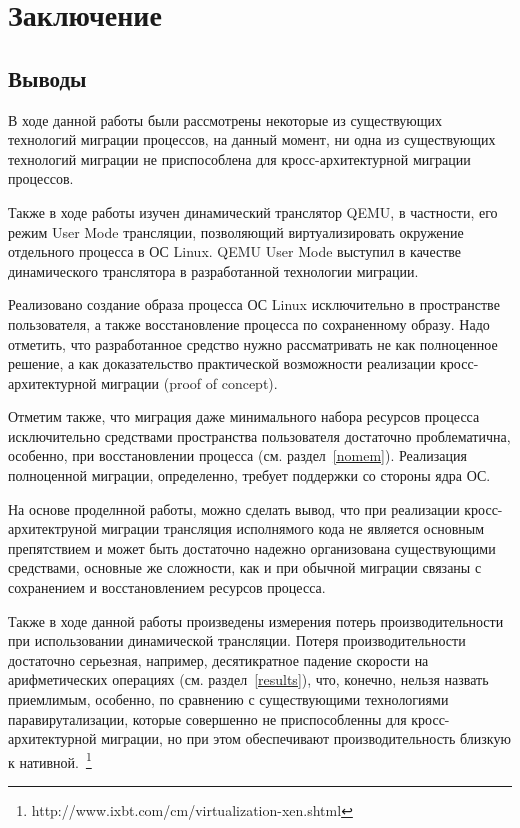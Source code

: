 \chapter{Заключение}

\section{Выводы}

В ходе данной работы были рассмотрены некоторые из существующих технологий миграции процессов, на данный момент, ни одна из существующих технологий миграции не приспособлена для кросс-архитектурной миграции процессов.

Также в ходе работы изучен динамический транслятор QEMU, в частности, его режим User Mode трансляции, позволяющий виртуализировать окружение отдельного процесса в ОС Linux. QEMU User Mode выступил в качестве динамического транслятора в разработанной технологии миграции.

Реализовано создание образа процесса ОС Linux исключительно в пространстве пользователя, а также восстановление процесса по сохраненному образу. Надо отметить, что разработанное средство нужно рассматривать не как полноценное решение, а как доказательство практической возможности реализации кросс-архитектурной миграции (proof of concept).

Отметим также, что миграция даже минимального набора ресурсов процесса исключительно средствами пространства пользователя достаточно проблематична, особенно, при восстановлении процесса (см. раздел~\ref{nomem}). Реализация полноценной миграции, определенно, требует поддержки со стороны ядра ОС.

На основе проделнной работы, можно сделать вывод, что при реализации кросс-архитектруной миграции трансляция исполнямого кода не является основным препятствием и может быть достаточно надежно организована существующими средствами, основные же сложности, как и при обычной миграции связаны с сохранением и восстановлением ресурсов процесса.

Также в ходе данной работы произведены измерения потерь производительности при использовании динамической трансляции. Потеря производительности достаточно серьезная, например, десятикратное падение скорости на арифметических операциях (см. раздел~\ref{results}), что, конечно, нельзя назвать приемлимым, особенно, по сравнению с существующими технологиями паравирутализации, которые совершенно не приспособленны для кросс-архитектурной миграции, но при этом обеспечивают производительность близкую к нативной.~\footnote{http://www.ixbt.com/cm/virtualization-xen.shtml}

